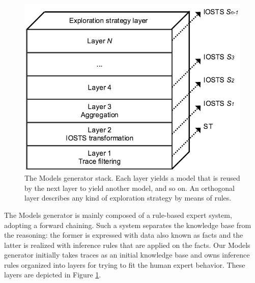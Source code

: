 \begin{figure}[ht]
    \begin{center}
        \includegraphics[width=1.0\linewidth]{figures/soict_se.png}
    \end{center}

    \caption {The Models generator stack. Each layer yields a
    model that is reused by the next layer to yield another
    model, and so on. An orthogonal layer describes any kind of
    exploration strategy by means of rules.}
    \label{fig:se}
\end{figure}

The Models generator is mainly composed of a rule-based expert
system, adopting a forward chaining. Such a system separates the
knowledge base from the reasoning: the former is expressed with
data also known as facts and the latter is realized with
inference rules that are applied on the facts. Our Models
generator initially takes traces as an initial knowledge base and
owns inference rules organized into layers for trying to fit the
human expert behavior. These layers are depicted in Figure
\ref{fig:se}.

